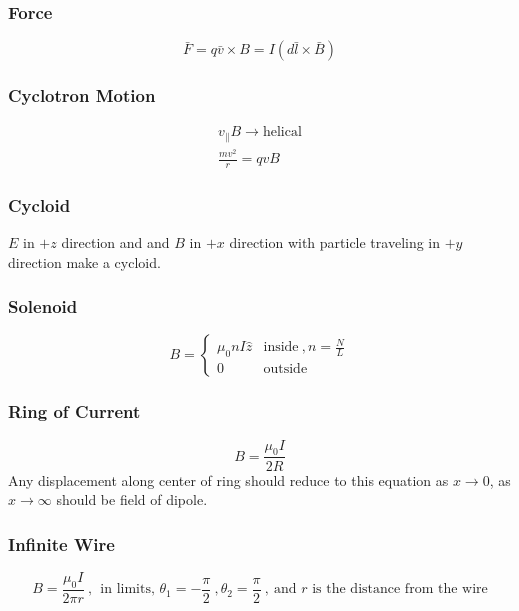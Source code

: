 \documentclass[10pt,a4paper]{article}
\begin{document}
\subsubsection{Force}
\begin{equation}
 \bar{F} = q\bar{v}\times{B}  = I(d\bar{l} \times \bar{B})
\end{equation}

\subsubsection{Cyclotron Motion}
\begin{align}
 v_\parallel B \rightarrow \textrm{helical}\\
 \frac{mv^2}{r} = qvB
\end{align}

\subsubsection{Cycloid}
$E$ in $+z$ direction and and $B$ in $+x$ direction with particle traveling in $+y$ direction make a cycloid.

\subsubsection{Solenoid}
\[
 B =
  \begin{cases}
   \mu_0nI \hat{z} & \textrm{inside} ~, n=\frac{N}{L}\\
   0 & \textrm{outside}
  \end{cases}
\]

\subsubsection{Ring of Current}
\begin{equation}
 B = \frac{\mu_0I}{2R} 
\end{equation}
Any displacement along center of ring should reduce to this equation as $x \rightarrow 0$, as $x \rightarrow \infty$ should be field of dipole.

\subsubsection{Infinite Wire}
\begin{equation}
 B = \frac{\mu_0I}{2\pi r}~,~~ \textrm{in limits, }\theta_1 = -\frac{\pi}{2}~, \theta_2 = \frac{\pi}{2}~,~\textrm{and } r \textrm{ is the distance from the wire}
\end{equation}
\end{document}
